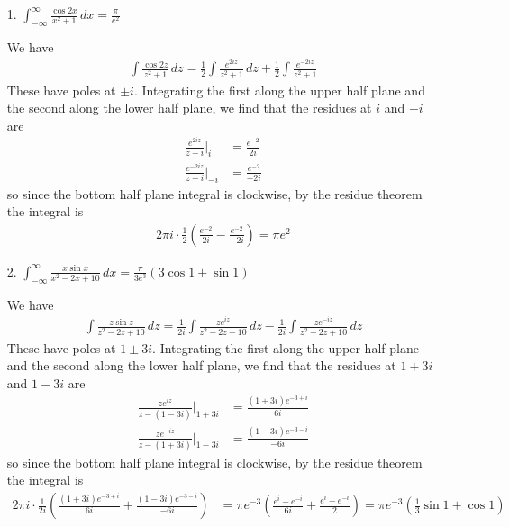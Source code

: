 \documentclass{article}
\begin{document}
\begin{itemize}
	\item[1.] $\int_{-\infty}^\infty \frac{\cos 2x}{x^2+1}\, dx=\frac{\pi}{e^2}$
		\begin{soln}
			We have
			\begin{align*}
				\int \frac{\cos 2z}{z^2+1}\, dz = \frac{1}{2}\int \frac{e^{2iz}}{z^2+1}\, dz + \frac{1}{2}\int \frac{e^{-2iz}}{z^2+1}
			\end{align*}
			These have poles at $\pm i.$ Integrating the first along the upper half plane and the second along the lower half plane, we find that the residues at $i$ and $-i$ are
			\begin{align*}
				\frac{e^{2iz}}{z+i}\bigg\vert_{i} &= \frac{e^{-2}}{2i} \\
				\frac{e^{-2iz}}{z-i}\bigg\vert_{-i} &= \frac{e^{-2}}{-2i}
			\end{align*}
			so since the bottom half plane integral is clockwise, by the residue theorem the integral is
			\begin{align*}
				2\pi i\cdot \frac{1}{2}\left( \frac{e^{-2}}{2i} - \frac{e^{-2}}{-2i} \right) = \pi e^{2}
			\end{align*}
		\end{soln}

	\item[2.] $\int_{-\infty}^\infty \frac{x\sin x}{x^2-2x+10}\, dx = \frac{\pi}{3e^3}(3\cos 1+\sin 1)$
		\begin{soln}
			We have
			\begin{align*}
				\int \frac{z\sin z}{z^2-2z+10}\, dz = \frac{1}{2i}\int \frac{ze^{iz}}{z^2-2z+10}\, dz - \frac{1}{2i}\int \frac{ze^{-iz}}{z^2-2z+10}\, dz
			\end{align*}
			These have poles at $1\pm 3i.$ Integrating the first along the upper half plane and the second along the lower half plane, we find that the residues at $1+3i$ and $1-3i$ are
			\begin{align*}
				\frac{ze^{iz}}{z-(1-3i)}\bigg\vert_{1+3i} &= \frac{(1+3i)e^{-3+i}}{6i} \\
				\frac{ze^{-iz}}{z-(1+3i)}\bigg\vert_{1-3i} &= \frac{(1-3i)e^{-3-i}}{-6i}
			\end{align*}
			so since the bottom half plane integral is clockwise, by the residue theorem the integral is
			\begin{align*}
				2\pi i\cdot \frac{1}{2i}\left( \frac{(1+3i)e^{-3+i}}{6i} + \frac{(1-3i)e^{-3-i}}{-6i} \right) &= \pi e^{-3} \left( \frac{e^i - e^{-i}}{6i} + \frac{e^i+e^{-i}}{2} \right) = \pi e^{-3} \left( \frac{1}{3}\sin 1 + \cos 1 \right)
			\end{align*}
		\end{soln}



\end{itemize}
\end{document}

